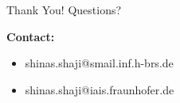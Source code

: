 \documentclass[aspectratio=169]{beamer}
\begin{document}
\begin{frame}{Thank You!}
  \centering
  \vfill
  {\LARGE Questions?}
  \vfill
  \raggedright\textbf{Contact:}
  \begin{itemize}
    \item shinas.shaji@smail.inf.h-brs.de
    \item shinas.shaji@iais.fraunhofer.de
  \end{itemize}
  \vfill
\end{frame}
\end{document}
